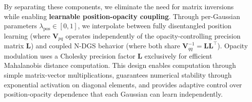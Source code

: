 \documentclass{article}
\begin{document}
By separating these components, we eliminate the need for matrix inversions while enabling \textbf{learnable position-opacity coupling}. Through per-Gaussian parameters $\lambda_\text{pos} \in [0,1]$, we interpolate between fully disentangled position learning (where $\mathbf{V}_{pq}$ operates independently of the opacity-controlling precision matrix $\mathbf{L}$) and coupled N-DGS behavior (where both share $\mathbf{V}_{qq}^{-1} = \mathbf{L}\mathbf{L}^\top$). Opacity modulation uses a Cholesky precision factor $\mathbf{L}$ exclusively for efficient Mahalanobis distance computation. This design enables computation through simple matrix-vector multiplications, guarantees numerical stability through exponential activation on diagonal elements, and provides adaptive control over position-opacity dependence that each Gaussian can learn independently.

\end{document}
